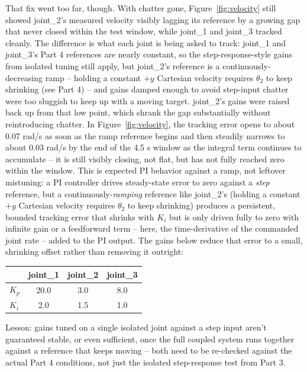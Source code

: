 \documentclass[12pt]{article}
\begin{document}
That fix went too far, though. With chatter gone, Figure~\ref{fig:velocity}
still showed joint\_2's measured velocity visibly lagging its reference by
a growing gap that never closed within the test window, while joint\_1 and
joint\_3 tracked cleanly. The difference is what each joint is being asked
to track: joint\_1 and joint\_3's Part 4 references are nearly constant, so
the step-response-style gains from isolated tuning still apply, but
joint\_2's reference is a continuously-decreasing ramp -- holding a
constant $+y$ Cartesian velocity requires $\theta_2$ to keep shrinking (see
Part 4) -- and gains damped enough to avoid step-input chatter were too
sluggish to keep up with a moving target. joint\_2's gains were raised back
up from that low point, which shrank the gap substantially without
reintroducing chatter. In Figure~\ref{fig:velocity}, the tracking error
opens to about 0.07 rad/s as soon as the ramp reference begins and then
steadily narrows to about 0.03 rad/s by the end of the 4.5 s window as the
integral term continues to accumulate -- it is still visibly closing, not
flat, but has not fully reached zero within the window. This is expected
PI behavior against a ramp, not leftover mistuning: a PI controller drives
steady-state error to zero against a \emph{step} reference, but a
continuously-\emph{ramping} reference like joint\_2's (holding a constant
$+y$ Cartesian velocity requires $\theta_2$ to keep shrinking) produces a
persistent, bounded tracking error that shrinks with $K_i$ but is only
driven fully to zero with infinite gain or a feedforward term -- here, the
time-derivative of the commanded joint rate -- added to the PI output. The
gains below reduce that error to a small, shrinking offset rather than
removing it outright:

\begin{center}
\begin{tabular}{lccc}
\toprule
 & joint\_1 & joint\_2 & joint\_3 \\
\midrule
$K_p$ & 20.0 & 3.0 & 8.0 \\
$K_i$ & 2.0  & 1.5 & 1.0 \\
\bottomrule
\end{tabular}
\end{center}

Lesson: gains tuned on a single isolated joint against a step input aren't
guaranteed stable, or even sufficient, once the full coupled system runs
together against a reference that keeps moving -- both need to be
re-checked against the actual Part 4 conditions, not just the isolated
step-response test from Part 3.
\end{document}
